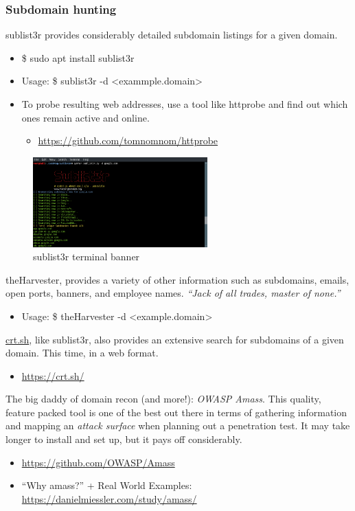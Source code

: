 \documentclass[a4paper,11pt]{article}
\renewcommand{\tt}[2][tt]{\textcolor{#1}{\ttfamily #2}}%
\begin{document}
\subsubsection{Subdomain hunting}

\tt{sublist3r} provides considerably detailed subdomain listings for a given domain.
\begin{itemize}
    \item \tt{\$ sudo apt install sublist3r}
    \item Usage: \tt{\$ sublist3r -d <exammple.domain>}
    \item To probe resulting web addresses, use a tool like httprobe and find out which ones remain active and online.
    \begin{itemize}
        \item \url{https://github.com/tomnomnom/httprobe}
    \end{itemize}
\end{itemize}

\begin{figure}[h]
    \centering
    \includegraphics[width=0.6\textwidth]{images/sublist3r.png}
    \caption{\tt{sublist3r} terminal banner}
    \label{fig:sublist3r}
\end{figure}

\tt{theHarvester}, provides a variety of other information such as subdomains, emails, open ports, banners, and employee names. \textit{``Jack of all trades, master of none.''}
\begin{itemize}
    \item Usage: \tt{\$ theHarvester -d <example.domain>}
\end{itemize}
\url{crt.sh}, like sublist3r, also provides an extensive search for subdomains of a given domain. This time, in a web format.
\begin{itemize}
    \item \url{https://crt.sh/}
\end{itemize}

The big daddy of domain recon (and more!): \textit{OWASP Amass}. This quality, feature packed tool is one of the best out there in terms of gathering information and mapping an \textit{attack surface} when planning out a penetration test. It may take longer to install and set up, but it pays off considerably.
\begin{itemize}
    \item \url{https://github.com/OWASP/Amass}
    \item ``Why amass?'' + Real World Examples: \url{https://danielmiessler.com/study/amass/}
\end{itemize}
\end{document}
